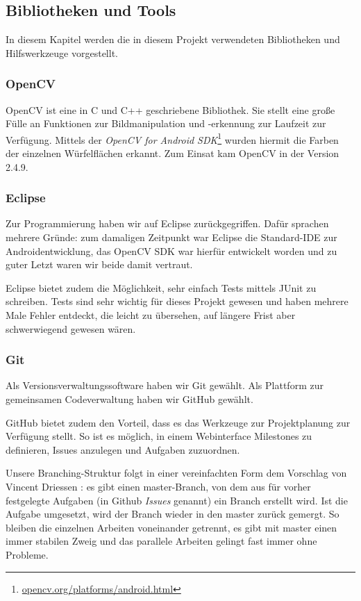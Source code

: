 \subsection{Bibliotheken und Tools}  %
In diesem Kapitel werden die in diesem Projekt verwendeten Bibliotheken und
Hilfswerkzeuge vorgestellt.

\subsubsection{OpenCV}  %

OpenCV ist eine in C und C++ geschriebene Bibliothek. Sie stellt eine große
Fülle an Funktionen zur Bildmanipulation und -erkennung zur Laufzeit zur
Verfügung. Mittels der \emph{OpenCV for Android
SDK}\footnote{\url{opencv.org/platforms/android.html}} wurden hiermit die Farben
der einzelnen Würfelflächen erkannt. Zum Einsat kam OpenCV in der Version 2.4.9.

\subsubsection{Eclipse}  %

Zur Programmierung haben wir auf Eclipse zurückgegriffen. Dafür sprachen mehrere
Gründe: zum damaligen Zeitpunkt war Eclipse die Standard-IDE zur
Androidentwicklung, das OpenCV SDK
war hierfür entwickelt worden und zu guter Letzt waren wir beide damit vertraut.

Eclipse bietet zudem die Möglichkeit, sehr einfach Tests mittels JUnit zu
schreiben. Tests sind sehr wichtig für dieses Projekt gewesen und haben mehrere
Male Fehler entdeckt, die leicht zu übersehen, auf längere Frist aber
schwerwiegend gewesen wären.

\subsubsection{Git}  %

Als Versionsverwaltungssoftware haben wir Git gewählt. Als Plattform zur
gemeinsamen Codeverwaltung haben wir GitHub gewählt. 

GitHub bietet zudem den Vorteil, dass es das Werkzeuge zur Projektplanung zur
Verfügung stellt. So ist es möglich, in einem Webinterface Milestones zu
definieren, Issues anzulegen und Aufgaben zuzuordnen.

Unsere Branching-Struktur folgt in einer vereinfachten Form dem Vorschlag von
Vincent Driessen \citep{git:driessen}: es gibt einen master-Branch, von dem aus
für vorher festgelegte Aufgaben (in Github \emph{Issues} genannt) ein Branch
erstellt wird. Ist die Aufgabe umgesetzt, wird der Branch wieder in den master
zurück gemergt. So bleiben die einzelnen Arbeiten voneinander getrennt, es gibt
mit master einen immer stabilen Zweig und das parallele Arbeiten gelingt fast
immer ohne Probleme.

